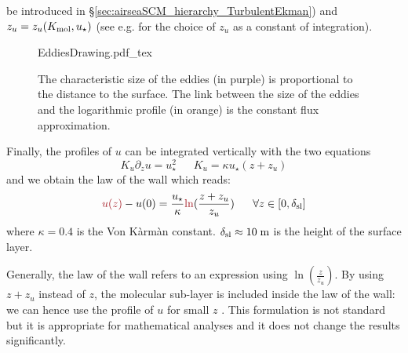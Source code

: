 be introduced in \S\ref{sec:airseaSCM_hierarchy_TurbulentEkman}) and
$z_{u} = z_{u}(K_{\rm mol}, u_\star)$
(see e.g. \citep{schlichting_boundary_1960}
for the choice of $z_{u}$ as a constant
of integration).
\begin{figure}
	\centering
	{EddiesDrawing.pdf_tex}
	\caption{The characteristic size of the eddies
	(in purple) is proportional to the distance to the
	surface. The link between the size of the eddies
	and the logarithmic profile (in orange) is
	the constant flux approximation.
	}
	\label{fig:airseaSCM_eddiesDrawing}
\end{figure}
\par
Finally, the profiles of $u$ can be integrated vertically with
the two equations
\begin{equation}
	K_u\partial_z u=u_\star^2 ~~~~~~~
	K_u= \kappa u_\star (z+z_u)
\end{equation}
and we obtain the law of the wall which reads:
\begin{equation}
	\label{eq:airseaSCM_LawOfWallProfile}
	\emphase{u(z)} - u(0) = \frac{u_\star}{\kappa}
	\emphase{\ln}(\frac{z+z_u}{z_u})
	~~~~~ \forall z\in [0,\delta_{\rm sl}]
\end{equation}
where $\kappa = 0.4$ is the Von Kàrmàn constant. 
$\delta_{\rm sl} \approx 10\;{\rm m}$ is the height of the surface layer.
\begin{remark}
	Generally, the law of the wall
	refers to an expression using
	$\ln(\frac{z}{z_u})$. By using $z+z_u$
	instead of $z$,
	the molecular sub-layer is included
	inside the law of the wall: we can hence
	use the profile of $u$ for small $z$
	\citep{pelletier_two-sided_2021}.
	This formulation is not standard but it is
	appropriate for mathematical analyses and
	it does not change the results
	significantly.
\end{remark}
